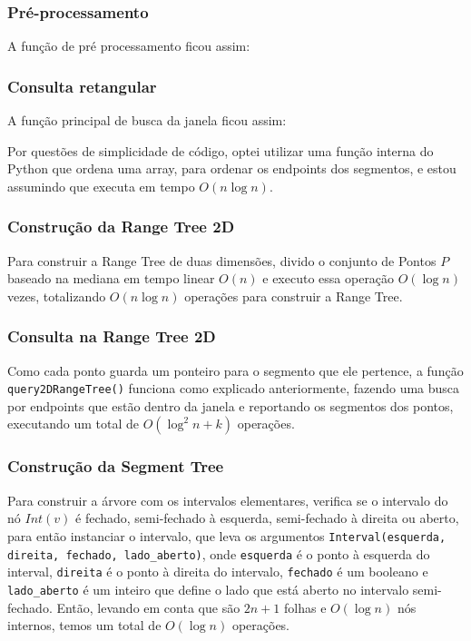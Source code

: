 \documentclass{article}
\theoremstyle{definition}
\begin{document}
\subsubsection*{Pré-processamento}
A função de pré processamento ficou assim:


\subsubsection*{Consulta retangular}

A função principal de busca da janela ficou assim:

\hspace*{15pt} Por questões de simplicidade de código, optei utilizar uma 
função interna do Python que ordena uma array, para ordenar os endpoints 
dos segmentos, e estou assumindo que executa em tempo $O(n\log n)$.

\subsubsection*{Construção da Range Tree 2D}

\hspace*{15pt} Para construir a Range Tree de duas dimensões, divido
o conjunto de Pontos $P$ baseado na mediana em tempo linear $O(n)$ e 
executo essa operação $O(\log n)$ vezes, totalizando $O(n\log n)$ 
operações para construir a Range Tree.


\subsubsection*{Consulta na Range Tree 2D}

\hspace*{15pt} Como cada ponto guarda um ponteiro para o segmento que ele
pertence, a função \texttt{query2DRangeTree()} funciona como explicado 
anteriormente, fazendo uma busca por endpoints que estão dentro da janela
e reportando os segmentos dos pontos, executando um total de $O(\log^2n + k)$
operações\cite{bergBook}. 


\subsubsection*{Construção da Segment Tree}

\hspace*{15pt} Para construir a árvore com os intervalos elementares, verifica
se o intervalo do nó $Int(v)$ é fechado, semi-fechado à esquerda, semi-fechado à direita
ou aberto, para então instanciar o intervalo, que leva os argumentos 
\texttt{Interval(esquerda, direita, fechado, lado\_aberto)}, onde \texttt{esquerda}
é o ponto à esquerda do interval, \texttt{direita} é o ponto à direita do intervalo,
\texttt{fechado} é um booleano e \texttt{lado\_aberto} é um inteiro que 
define o lado que está aberto no intervalo semi-fechado. Então, levando em conta
que são $2n + 1$ folhas e $O(\log n)$ nós internos, temos um total de 
$O(\log n)$ operações.

\end{document}
